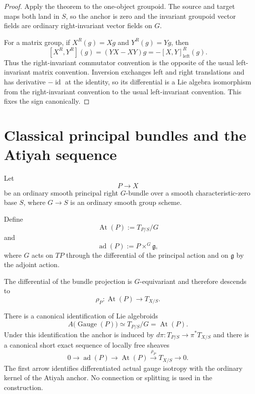 \begin{proof}
Apply the theorem to the one-object groupoid.  The source and target maps both
land in $S$, so the anchor is zero and the invariant groupoid vector fields are
ordinary right-invariant vector fields on $G$.

For a matrix group, if $X^R(g)=Xg$ and $Y^R(g)=Yg$, then
\[
    [X^R,Y^R](g)
    =(YX-XY)g
    =-[X,Y]_{\mathrm{left}}^R(g).
\]
Thus the right-invariant commutator convention is the opposite of the usual
left-invariant matrix convention.  Inversion exchanges left and right
translations and has derivative $-\operatorname{id}$ at the identity, so its
differential is a Lie algebra isomorphism from the right-invariant convention
to the usual left-invariant convention.  This fixes the sign canonically.
\end{proof}

\section{Classical principal bundles and the Atiyah sequence}
\label{sec:bnla-classical-atiyah}

Let
\[
    P\longrightarrow X
\]
be an ordinary smooth principal right $G$-bundle over a smooth
characteristic-zero base $S$, where $G\to S$ is an ordinary smooth group
scheme.

\begin{definition}
\label{def:bnla-classical-atiyah-bundles}
Define
\[
    \operatorname{At}(P)
    :=
    T_{P/S}/G
\]
and
\[
    \operatorname{ad}(P)
    :=
    P\times^G\mathfrak g,
\]
where $G$ acts on $TP$ through the differential of the principal action and on
$\mathfrak g$ by the adjoint action.
\end{definition}

The differential of the bundle projection is $G$-equivariant and therefore
descends to
\[
    \rho_P:
    \operatorname{At}(P)
    \longrightarrow
    T_{X/S}.
\]

\begin{theorem}
\label{thm:bnla-classical-atiyah}
There is a canonical identification of Lie algebroids
\[
\boxed{
    A\bigl(\operatorname{Gauge}(P)\bigr)
    \simeq
    T_{P/S}/G
    =
    \operatorname{At}(P).}
\]
Under this identification the anchor is induced by $d\pi:T_{P/S}\to
\pi^*T_{X/S}$ and there is a canonical short exact sequence of locally free
sheaves
\[
\boxed{
    0
    \longrightarrow
    \operatorname{ad}(P)
    \longrightarrow
    \operatorname{At}(P)
    \xrightarrow{\rho_P}
    T_{X/S}
    \longrightarrow
    0.}
\]
The first arrow identifies differentiated actual gauge isotropy with the
ordinary kernel of the Atiyah anchor.  No connection or splitting is used in
the construction.
\end{theorem}

